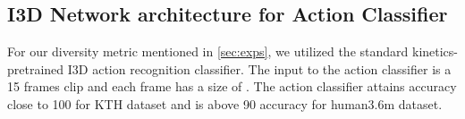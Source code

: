\documentclass{article} \usepackage{iclr2021_conference,times}
\begin{document}
\subsection{I3D  Network architecture for Action Classifier}
For our diversity metric mentioned in \ref{sec:exps}, we utilized the standard kinetics-pretrained I3D action recognition classifier. The input to the action classifier is a 15 frames clip and each frame has a size of . The action classifier attains accuracy close to 100 for KTH dataset and is above 90 accuracy for human3.6m dataset.
\end{document}
